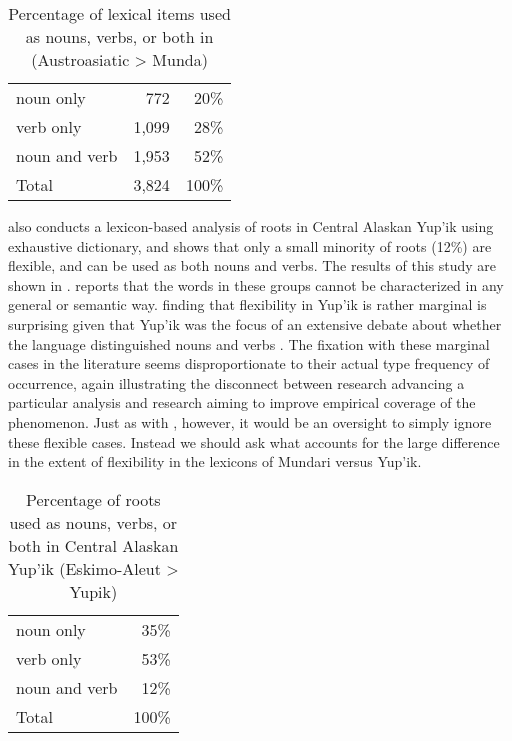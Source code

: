 \begin{table}[h]
  \centering
  \caption[Percentage of lexical items used as nouns, verbs, or both in Mundari (Austroasiatic > Munda)]{Percentage of lexical items used as nouns, verbs, or both in  (Austroasiatic > Munda) \parencite[383]{EvansOsada2005}}
  \label{tab:Evans-Osada-2005}
  \begin{tabular}{ l r r }
    \toprule
    noun only     &   772 &  20\% \\
    verb only     & 1,099 &  28\% \\
    noun and verb & 1,953 &  52\% \\
    \midrule
    Total         & 3,824 & 100\% \\
    \bottomrule
  \end{tabular}
\end{table}

\textcite[163]{Mithun2017} also conducts a lexicon-based analysis of roots in Central Alaskan Yup'ik using  exhaustive dictionary, and shows that only a small minority of roots (12\%) are flexible, and can be used as both nouns and verbs. The results of this study are shown in . \citeauthor{Mithun2017} reports that the words in these groups cannot be characterized in any general or semantic way.  finding that flexibility in Yup'ik is rather marginal is surprising given that Yup'ik was the focus of an extensive debate about whether the language distinguished nouns and verbs \parencite{Sadock1999}. The fixation with these marginal cases in the literature seems disproportionate to their actual type frequency of occurrence, again illustrating the disconnect between research advancing a particular analysis and research aiming to improve empirical coverage of the phenomenon. Just as with , however, it would be an oversight to simply ignore these flexible cases. Instead we should ask what accounts for the large difference in the extent of flexibility in the lexicons of Mundari versus Yup'ik.

\begin{table}[h]
  \centering
  \caption[Percentage of roots used as nouns, verbs, or both in Central Alaskan Yup'ik (Eskimo-Aleut > Yupik)]{Percentage of roots used as nouns, verbs, or both in Central Alaskan Yup'ik (Eskimo-Aleut > Yupik) \parencite[163]{Mithun2017}}
  \label{tab:Mithun-2017}
  \begin{tabular}{ l r }
    \toprule
    noun only     &  35\% \\
    verb only     &  53\% \\
    noun and verb &  12\% \\
    \midrule
    Total         & 100\% \\
    \bottomrule
  \end{tabular}
\end{table}

